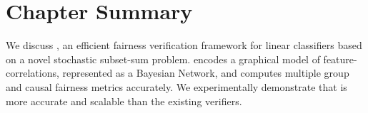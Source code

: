 \section{Chapter Summary}
We discuss {\fvgm}, an efficient fairness verification framework for linear classifiers based on a novel stochastic subset-sum problem. {\fvgm} encodes a graphical model of feature-correlations, represented as a Bayesian Network, and computes multiple group and causal fairness metrics accurately. We experimentally demonstrate that {\fvgm} is  more accurate and scalable than the existing verifiers.
\begin{comment}
\end{comment}

